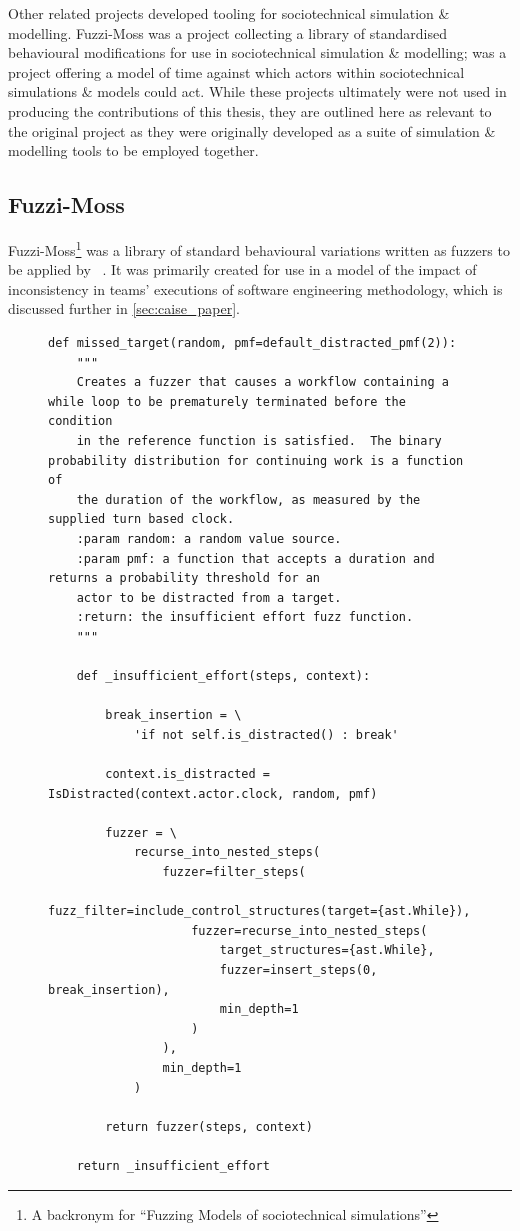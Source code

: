 Other related projects developed tooling for sociotechnical simulation \&
modelling. Fuzzi-Moss was a project collecting a library of standardised
behavioural modifications for use in sociotechnical simulation \& modelling;
\theatreag{} was a project offering a model of time against which actors within
sociotechnical simulations \& models could act. While these projects ultimately
were not used in producing the contributions of this thesis, they are outlined
here as relevant to the original \pdsf project as they were originally
developed as a suite of simulation \& modelling tools to be employed together.

\subsection{Fuzzi-Moss}\label{subsec:prior_work_fm}

Fuzzi-Moss\footnote{A backronym for ``Fuzzing Models of sociotechnical
simulations''} was a library of standard behavioural variations written as
fuzzers to be applied by \pdsf{}~\cite{fuzzimoss_repo}. It was primarily created
for use in a model of the impact of inconsistency in teams' executions of
software engineering methodology, which is discussed further in
\cref{sec:caise_paper}.

\begin{figure}
    \begin{lstlisting}
def missed_target(random, pmf=default_distracted_pmf(2)):
    """
    Creates a fuzzer that causes a workflow containing a while loop to be prematurely terminated before the condition
    in the reference function is satisfied.  The binary probability distribution for continuing work is a function of
    the duration of the workflow, as measured by the supplied turn based clock.
    :param random: a random value source.
    :param pmf: a function that accepts a duration and returns a probability threshold for an
    actor to be distracted from a target.
    :return: the insufficient effort fuzz function.
    """

    def _insufficient_effort(steps, context):

        break_insertion = \
            'if not self.is_distracted() : break'

        context.is_distracted = IsDistracted(context.actor.clock, random, pmf)

        fuzzer = \
            recurse_into_nested_steps(
                fuzzer=filter_steps(
                    fuzz_filter=include_control_structures(target={ast.While}),
                    fuzzer=recurse_into_nested_steps(
                        target_structures={ast.While},
                        fuzzer=insert_steps(0, break_insertion),
                        min_depth=1
                    )
                ),
                min_depth=1
            )

        return fuzzer(steps, context)

    return _insufficient_effort
    \end{lstlisting}
\end{figure}

